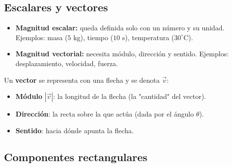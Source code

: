 \documentclass[12pt, letterpaper]{article}
\begin{document}
\subsection{Escalares y vectores}

\begin{cuadroteoria}
  \begin{itemize}[leftmargin=*]
    \item \textbf{Magnitud escalar:} queda definida solo con un número y su unidad. Ejemplos: masa ($5$ kg), tiempo ($10$ s), temperatura ($30^{\circ}$C).
    \item \textbf{Magnitud vectorial:} necesita módulo, dirección y sentido. Ejemplos: desplazamiento, velocidad, fuerza.
  \end{itemize}

  Un \textbf{vector} se representa con una flecha y se denota $\vec{v}$:
  \begin{center}
  \end{center}
  \begin{itemize}[leftmargin=*]
    \item \textbf{Módulo} $|\vec{v}|$: la longitud de la flecha (la "cantidad" del vector).
    \item \textbf{Dirección}: la recta sobre la que actúa (dada por el ángulo $\theta$).
    \item \textbf{Sentido}: hacia dónde apunta la flecha.
  \end{itemize}
\end{cuadroteoria}

\subsection{Componentes rectangulares}
\end{document}

